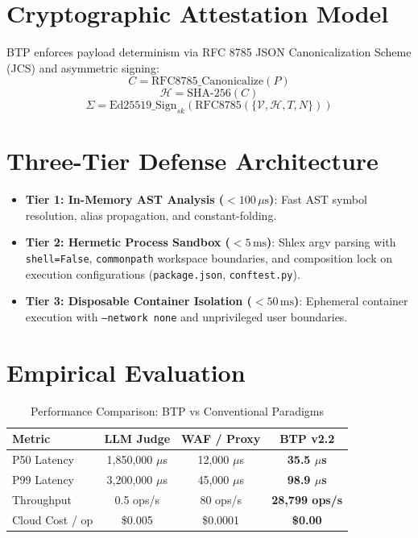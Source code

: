 \documentclass[conference]{IEEEtran}
\begin{document}
\section{Cryptographic Attestation Model}
BTP enforces payload determinism via RFC 8785 JSON Canonicalization Scheme (JCS) and asymmetric signing:
\begin{equation}
C = \text{RFC8785\_Canonicalize}(P)
\end{equation}
\begin{equation}
\mathcal{H} = \text{SHA-256}(C)
\end{equation}
\begin{equation}
\Sigma = \text{Ed25519\_Sign}_{sk}(\text{RFC8785}(\{\mathcal{V}, \mathcal{H}, T, N\}))
\end{equation}

\section{Three-Tier Defense Architecture}
\begin{itemize}
    \item \textbf{Tier 1: In-Memory AST Analysis ($<100\,\mu\text{s}$)}: Fast AST symbol resolution, alias propagation, and constant-folding.
    \item \textbf{Tier 2: Hermetic Process Sandbox ($<5\,\text{ms}$)}: Shlex argv parsing with \texttt{shell=False}, \texttt{commonpath} workspace boundaries, and composition lock on execution configurations (\texttt{package.json}, \texttt{conftest.py}).
    \item \textbf{Tier 3: Disposable Container Isolation ($<50\,\text{ms}$)}: Ephemeral container execution with \texttt{--network none} and unprivileged user boundaries.
\end{itemize}

\section{Empirical Evaluation}
\begin{table}[htbp]
\caption{Performance Comparison: BTP vs Conventional Paradigms}
\begin{center}
\begin{tabular}{lccc}
\toprule
\textbf{Metric} & \textbf{LLM Judge} & \textbf{WAF / Proxy} & \textbf{BTP v2.2} \\
\midrule
P50 Latency & 1,850,000 $\mu$s & 12,000 $\mu$s & \textbf{35.5 $\mu$s} \\
P99 Latency & 3,200,000 $\mu$s & 45,000 $\mu$s & \textbf{98.9 $\mu$s} \\
Throughput & 0.5 ops/s & 80 ops/s & \textbf{28,799 ops/s} \\
Cloud Cost / op & \$0.005 & \$0.0001 & \textbf{\$0.00} \\
\bottomrule
\end{tabular}
\end{center}
\end{table}
\end{document}

